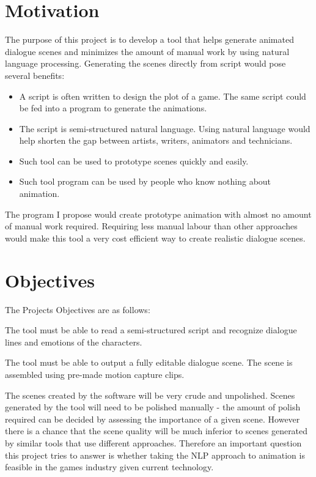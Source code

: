 \section{Motivation}

The purpose of this project is to develop a tool that helps generate animated dialogue scenes and minimizes the amount of manual work by using natural language processing. Generating the scenes directly from script would pose several benefits:

\begin{itemize}
	\item A script is often written to design the plot of a game. The same script could be fed into a program to generate the animations.
	\item The script is semi-structured natural language. Using natural language would help shorten the gap between artists, writers, animators and technicians.
	\item Such tool can be used to prototype scenes quickly and easily.
	\item Such tool program can be used by people who know nothing about animation.
\end{itemize}

The program I propose would create prototype animation with almost no amount of manual work required. Requiring less manual labour than other approaches would make this tool a very cost efficient way to create realistic dialogue scenes.

\section{Objectives}

The Projects Objectives are as follows:


\noindent The tool must be able to read a semi-structured script and recognize dialogue lines and emotions of the characters.


\noindent The tool must be able to output a fully editable dialogue scene. The scene is assembled using pre-made motion capture clips.

\bigskip
The scenes created by the software will be very crude and unpolished. Scenes generated by the tool will need to be polished manually - the amount of polish required can be decided by assessing the importance of a given scene. However there is a chance that the scene quality will be much inferior to scenes generated by similar tools that use different approaches. Therefore an important question this project tries to answer is whether taking the NLP approach to animation is feasible in the games industry given current technology.
